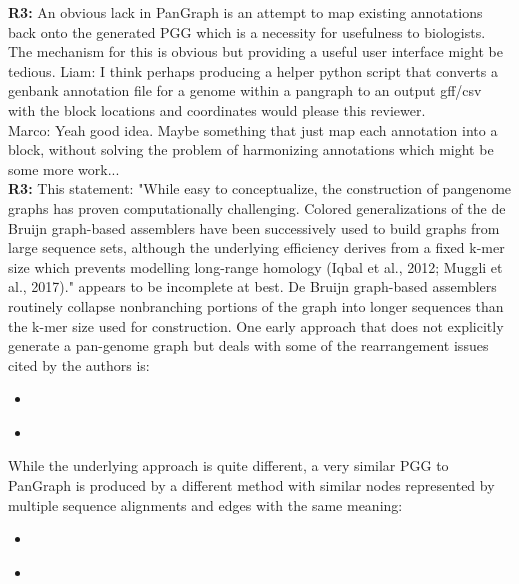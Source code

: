 \documentclass[aps,rmp,onecolumn]{revtex4-1}
\newcommand{\Marco}[1]{{\color{gray}Marco: #1}}
\newcommand{\Liam}[1]{{\color{teal}Liam: #1}}
\newcommand{\reviewer}[2]{\textbf{#1:} #2\vskip 5mm}
\begin{document}
\reviewer{R3}{An obvious lack in PanGraph is an attempt to map existing annotations back onto the generated PGG which is a necessity for usefulness to biologists. The mechanism for this is obvious but providing a useful user interface might be tedious.}
\Liam{I think perhaps producing a helper python script that converts a genbank annotation file for a genome within a pangraph to an output gff/csv with the block locations and coordinates would please this reviewer.}\\
\Marco{Yeah good idea. Maybe something that just map each annotation into a block, without solving the problem of harmonizing annotations which might be some more work...}\\

\reviewer{R3}{This statement: "While easy to conceptualize, the construction of pangenome graphs has proven computationally challenging. Colored generalizations of the de Bruijn graph-based assemblers have been successively used to build graphs from large sequence sets, although the underlying efficiency derives from a fixed k-mer size which prevents modelling long-range homology (Iqbal et al., 2012; Muggli et al., 2017)." appears to be incomplete at best. De Bruijn graph-based assemblers routinely collapse nonbranching portions of the graph into longer sequences than the k-mer size used for construction.
      One early approach that does not explicitly generate a pan-genome graph but deals with some of the rearrangement issues cited by the authors is:
      \begin{itemize}
            \item \cite{angiuoli2011improving}
            \item \cite{angiuoli2011mugsy}
      \end{itemize}
      While the underlying approach is quite different, a very similar PGG to PanGraph is produced by a different method with similar nodes represented by multiple sequence alignments and edges with the same meaning:
      \begin{itemize}
            \item \cite{sutton2021pan}
            \item \cite{chan2015novel}
      \end{itemize}}
\end{document}
